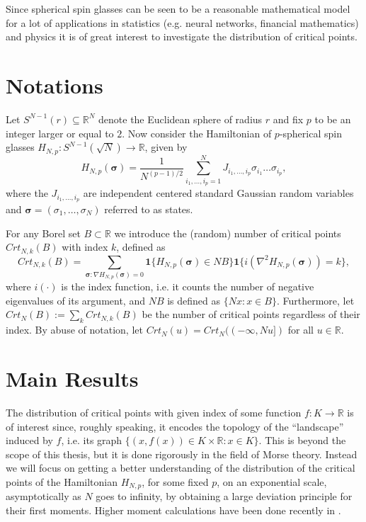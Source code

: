 Since spherical spin glasses can be seen to be a reasonable mathematical model for a lot of applications in statistics (e.g. neural networks, financial mathematics) and physics it is of great interest to investigate the distribution of critical points.

\section{Notations}
Let $S^{N-1}(r)\subseteq\mathbb R^N$ denote the Euclidean sphere of radius $r$ and fix $p$ to be an integer larger or equal to $2$. Now consider the Hamiltonian of $p$-spherical spin glasses $H_{N,p}: S^{N-1}(\sqrt N)\rightarrow\mathbb R$, given by
$$H_{N,p}(\bm\sigma)=\frac{1}{N^{(p-1)/2}}\sum_{i_1,\dots,i_p=1}^N J_{i_1,\dots,i_p}\sigma_{i_1}\dots\sigma_{i_p},$$
where the $J_{i_1,\dots,i_p}$ are independent centered standard Gaussian random variables and $\bm\sigma=(\sigma_1,\dots,\sigma_N)$ referred to as states.

For any Borel set $B\subset\mathbb R$ we introduce the (random) number of critical points $Crt_{N,k}(B)$ with index $k$, defined as
$$Crt_{N,k}(B) = \sum_{\bm\sigma : \nabla H_{N,p}(\bm\sigma)=0}\bm 1\{H_{N,p}(\bm\sigma)\in NB\}\bm 1\{i(\nabla^2 H_{N,p}(\bm\sigma))=k\},$$
where $i(\cdot)$ is the index function, i.e. it counts the number of negative eigenvalues of its argument, and $NB$ is defined as $\{Nx : x\in B\}$. Furthermore, let $Crt_N(B):=\sum_k Crt_{N,k}(B)$ be the number of critical points regardless of their index.
By abuse of notation, let $Crt_N(u) = Crt_N((-\infty,Nu])$ for all $u\in\mathbb R$.



\section{Main Results}
The distribution of critical points with given index of some function $f:K\rightarrow\mathbb R$ is of interest since, roughly speaking, it encodes the topology of the ``landscape'' induced by $f$, i.e. its graph $\{(x,f(x))\in K\times\mathbb R : x\in K \}$. This is beyond the scope of this thesis, but it is done rigorously in the field of Morse theory. Instead we will focus on getting a better understanding of the distribution of the critical points of the Hamiltonian $H_{N,p}$, for some fixed $p$, on an exponential scale, asymptotically as $N$ goes to infinity, by obtaining a large deviation principle for their first moments. Higher moment calculations have been done recently in \cite{subag2015extremal}.


